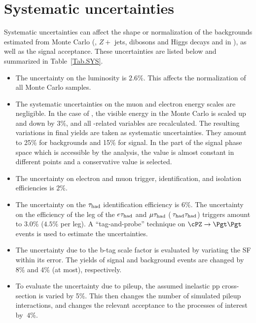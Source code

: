 \section{Systematic uncertainties}
\label{sect:sys}
Systematic uncertainties can affect the shape or normalization of the
backgrounds estimated from Monte Carlo (\ttbar, $Z+$ jets, dibosons and Higgs decays and \wjets in \tauTau \bintwo), 
as well as the signal acceptance.
These uncertainties are listed below and summarized in Table~\ref{Tab.SYS}.


\begin{itemize}

\item The uncertainty on the luminosity  is $2.6\%$.  This affects the
  normalization of all Monte Carlo samples.
 
\item  The systematic uncertainties on the muon and electron energy scales
  are negligible.  In the case of \Tau, the visible energy in the Monte Carlo
  is scaled up and down by $3\%$, and all \Tau-related variables are
  recalculated.  The resulting variations in final yields are taken as
  systematic
  uncertainties.  They amount to 25\% for backgrounds and 15\% for signal.
  In the part of the signal phase space which is accessible by the analysis,
  the value is almost constant in different points and a conservative value is selected.

\item The uncertainty on electron and muon trigger, identification, and
  isolation efficiencies is $2\%$.

\item The uncertainty on the $\tau_{\rm had}$ identification efficiency is $6\%$. 
  The uncertainty on the efficiency of the \Tau leg of the $e\tau_{\rm had}$ and
  $\mu\tau_{\rm had}$ ($\,\tau_{\rm had}\tau_{\rm had}$) triggers amount to $3.0\%$ ($4.5\%$ per leg).
  A ``tag-and-probe'' technique on $\cPZ\to \Pgt\Pgt$ events is used to estimate the 
  uncertainties.

\item The uncertainty due to the b-tag scale factor is evaluated by variating the 
SF within its error. The yields of signal and background events are changed by 8\% 
and 4\% (at most), respectively.
 
\item To evaluate the uncertainty due to pileup, the assumed inelastic
  pp cross-section is varied by 5\%.  This then changes the number
  of simulated pileup interactions, and changes the relevant acceptance
  to the processes of interest by $~4 \%$.


\end{itemize}
